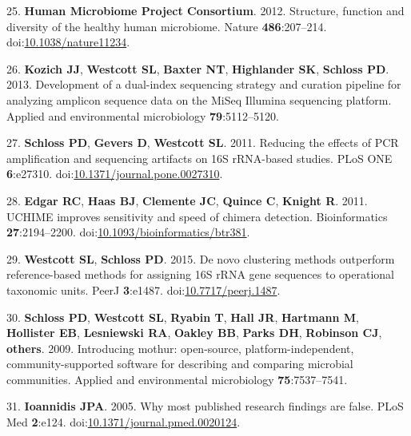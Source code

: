 \documentclass[12pt,]{article}
\begin{document}
\hypertarget{ref-humanux5fmicrobiomeux5fprojectux5fconsortiumux5fstructureux5f2012}{}
25. \textbf{Human Microbiome Project Consortium}. 2012. Structure,
function and diversity of the healthy human microbiome. Nature
\textbf{486}:207--214.
doi:\href{https://doi.org/10.1038/nature11234}{10.1038/nature11234}.

\hypertarget{ref-Kozichux5f2013}{}
26. \textbf{Kozich JJ}, \textbf{Westcott SL}, \textbf{Baxter NT},
\textbf{Highlander SK}, \textbf{Schloss PD}. 2013. Development of a
dual-index sequencing strategy and curation pipeline for analyzing
amplicon sequence data on the MiSeq Illumina sequencing platform.
Applied and environmental microbiology \textbf{79}:5112--5120.

\hypertarget{ref-Schloss2011}{}
27. \textbf{Schloss PD}, \textbf{Gevers D}, \textbf{Westcott SL}. 2011.
Reducing the effects of PCR amplification and sequencing artifacts on
16S rRNA-based studies. PLoS ONE \textbf{6}:e27310.
doi:\href{https://doi.org/10.1371/journal.pone.0027310}{10.1371/journal.pone.0027310}.

\hypertarget{ref-Edgar2011}{}
28. \textbf{Edgar RC}, \textbf{Haas BJ}, \textbf{Clemente JC},
\textbf{Quince C}, \textbf{Knight R}. 2011. UCHIME improves sensitivity
and speed of chimera detection. Bioinformatics \textbf{27}:2194--2200.
doi:\href{https://doi.org/10.1093/bioinformatics/btr381}{10.1093/bioinformatics/btr381}.

\hypertarget{ref-Westcott2015}{}
29. \textbf{Westcott SL}, \textbf{Schloss PD}. 2015. De novo clustering
methods outperform reference-based methods for assigning 16S rRNA gene
sequences to operational taxonomic units. PeerJ \textbf{3}:e1487.
doi:\href{https://doi.org/10.7717/peerj.1487}{10.7717/peerj.1487}.

\hypertarget{ref-mothur}{}
30. \textbf{Schloss PD}, \textbf{Westcott SL}, \textbf{Ryabin T},
\textbf{Hall JR}, \textbf{Hartmann M}, \textbf{Hollister EB},
\textbf{Lesniewski RA}, \textbf{Oakley BB}, \textbf{Parks DH},
\textbf{Robinson CJ}, \textbf{others}. 2009. Introducing mothur:
open-source, platform-independent, community-supported software for
describing and comparing microbial communities. Applied and
environmental microbiology \textbf{75}:7537--7541.

\hypertarget{ref-Ioannidis2005}{}
31. \textbf{Ioannidis JPA}. 2005. Why most published research findings
are false. PLoS Med \textbf{2}:e124.
doi:\href{https://doi.org/10.1371/journal.pmed.0020124}{10.1371/journal.pmed.0020124}.
\end{document}
